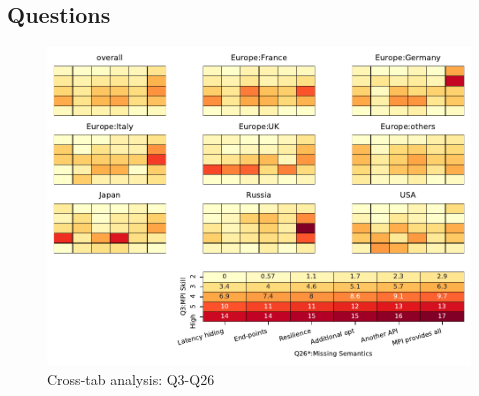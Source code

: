 
\subsection{Questions}


\begin{figure}
\begin{center}
\includegraphics[width=12cm]{../pdfs/Q3-Q26.pdf}
\caption{Cross-tab analysis: Q3-Q26}
\label{fig:Q3-Q26}
\end{center}
\end{figure}
